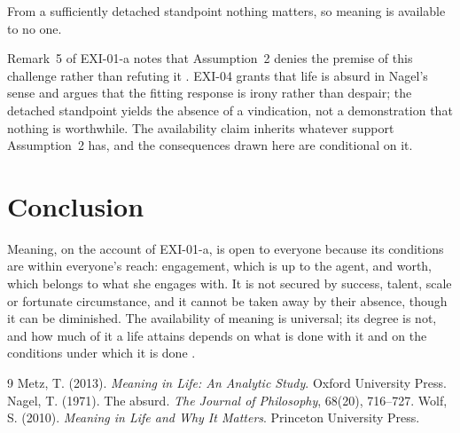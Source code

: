 \documentclass{situationist-preprint}
\begin{document}
\begin{objection}
From a sufficiently detached standpoint nothing matters, so meaning is available to no one.
\end{objection}

\begin{reply}
Remark~5 of EXI-01-a notes that Assumption~2 denies the premise of this challenge rather than refuting it \citep{Nagel1971}. EXI-04 grants that life is absurd in Nagel's sense and argues that the fitting response is irony rather than despair; the detached standpoint yields the absence of a vindication, not a demonstration that nothing is worthwhile. The availability claim inherits whatever support Assumption~2 has, and the consequences drawn here are conditional on it.
\end{reply}

\section{Conclusion}

Meaning, on the account of EXI-01-a, is open to everyone because its conditions are within everyone's reach: engagement, which is up to the agent, and worth, which belongs to what she engages with. It is not secured by success, talent, scale or fortunate circumstance, and it cannot be taken away by their absence, though it can be diminished. The availability of meaning is universal; its degree is not, and how much of it a life attains depends on what is done with it and on the conditions under which it is done \citep{Metz2013}.

\begin{thebibliography}{9}\small
{} Metz, T. (2013). \emph{Meaning in Life: An Analytic Study}. Oxford University Press.
 Nagel, T. (1971). The absurd. \emph{The Journal of Philosophy}, 68(20), 716--727.
 Wolf, S. (2010). \emph{Meaning in Life and Why It Matters}. Princeton University Press.
\end{thebibliography}
\end{document}
